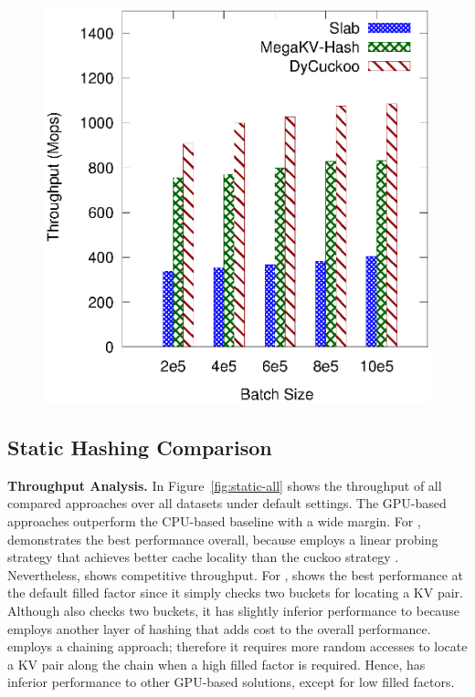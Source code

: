 \begin{figure}[htp]
\begin{minipage}{0.19\linewidth}
		\centerline{\dsali}
	\end{minipage}
	\begin{minipage}{0.19\linewidth}\centering
		\includegraphics[width=\linewidth]{pic/dynamic/batch/dynamic_random.eps}
		\centerline{\dsrandom}
	\end{minipage}
	\caption{}
	\label{fig:vary-batch-size}
\end{figure}

\subsection{Static Hashing Comparison}\label{sec:exp:static}

\vspace{1mm}\noindent\textbf{Throughput Analysis.} In Figure~\ref{fig:static-all} shows the throughput of all compared approaches over all datasets under default settings.
The GPU-based approaches outperform the CPU-based baseline with a wide margin. For , \warp demonstrates the best performance overall, because \warp employs a linear probing strategy that achieves better cache locality than the cuckoo strategy \cite{junger2018warpdrive}. Nevertheless, \voter shows competitive throughput. 
For , \megakv shows the best performance at the default filled factor since it simply checks two buckets for locating a KV pair.
Although \voter also checks two buckets, it has slightly inferior performance to \megakv because \voter employs another layer of hashing that adds cost to the overall performance.
\slab employs a chaining approach; therefore it requires more random accesses to locate a KV pair along the chain when a high filled factor is required. Hence, \slab has inferior performance to other GPU-based solutions, except for low filled factors.



